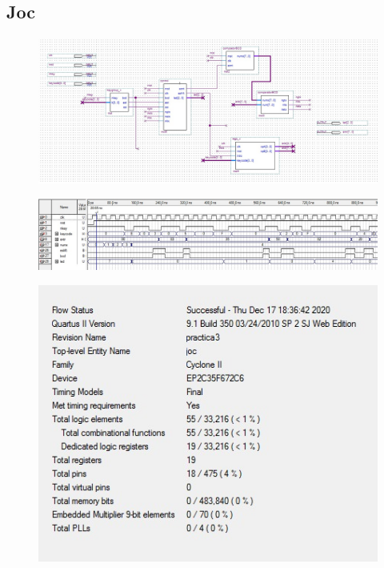 \documentclass[12pt, a4papre]{article}
\begin{document}
	
	\subsection{Joc}
	
	
				\begin{figure}[H]
		\begin{center}
		\includegraphics[width=130mm]{joc.jpeg}
		\end{center}
	\end{figure}	
			\begin{figure}[H]
		\begin{center}
		\includegraphics[width=130mm]{simulacioJoc.jpeg}
		\end{center}
	\end{figure}	
			\begin{figure}[H]
		\begin{center}
		\includegraphics[width=130mm]{informeJoc.jpeg}
		\end{center}
	\end{figure}	
\end{document}
